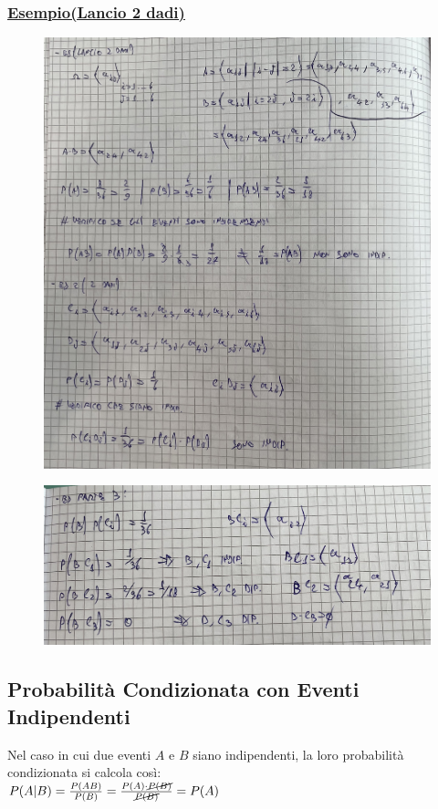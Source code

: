 \documentclass{article}
\begin{document}
\subsubsection{\underline{Esempio(Lancio 2 dadi)}}
\begin{figure}[ht]
\centering
\includegraphics[scale=0.13]{ese/5.jpeg} 
\end{figure}
\begin{figure}[ht]
\centering
\includegraphics[scale=0.11]{ese/5a.jpeg} 
\end{figure}

\subsection{Probabilità Condizionata con Eventi Indipendenti}
Nel caso in cui due eventi $A$ e $B$ siano indipendenti, la loro probabilità condizionata si calcola così: \\ 
$P(A|B) = \frac{P(AB)}{P(B)} = \frac{P(A) \cdot \cancel{P(B)}}{\cancel{P(B)}} = P(A)$
\end{document}
